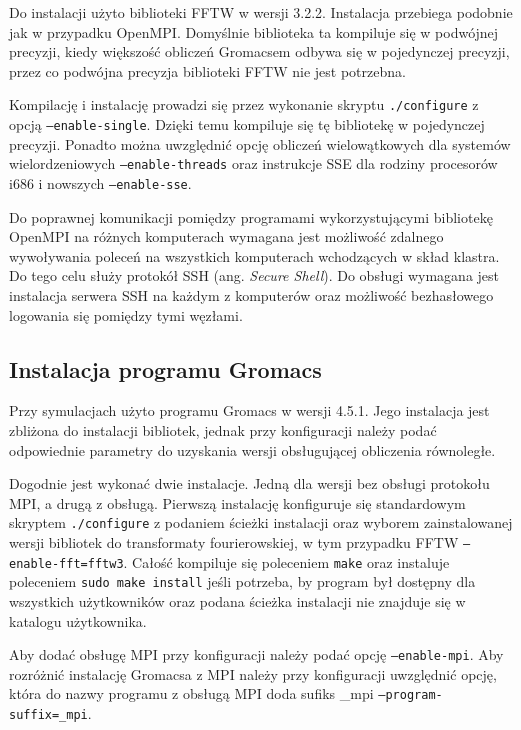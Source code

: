 Do instalacji użyto biblioteki FFTW w wersji 3.2.2. Instalacja przebiega podobnie jak w przypadku OpenMPI. Domyślnie biblioteka ta kompiluje się w podwójnej precyzji, kiedy większość obliczeń Gromacsem odbywa się w pojedynczej precyzji, przez co podwójna precyzja biblioteki FFTW nie jest potrzebna. 

Kompilację i instalację prowadzi się przez wykonanie skryptu \texttt{./configure} z opcją \texttt{--enable-single}. Dzięki temu kompiluje się tę bibliotekę w pojedynczej precyzji. Ponadto można uwzględnić opcję obliczeń wielowątkowych dla systemów wielordzeniowych \texttt{--enable-threads} oraz instrukcje SSE dla rodziny procesorów i686 i nowszych \texttt{--enable-sse}.

Do poprawnej komunikacji pomiędzy programami wykorzystującymi bibliotekę OpenMPI na różnych komputerach wymagana jest możliwość zdalnego wywoływania poleceń na wszystkich komputerach wchodzących w skład klastra. Do tego celu służy protokół SSH (ang. \textit{Secure Shell}). Do obsługi wymagana jest instalacja serwera SSH na każdym z komputerów oraz możliwość bezhasłowego logowania się pomiędzy tymi węzłami. 

\subsection{Instalacja programu Gromacs}

Przy symulacjach użyto programu Gromacs w wersji 4.5.1. Jego instalacja jest zbliżona do instalacji bibliotek, jednak przy konfiguracji należy podać odpowiednie parametry do uzyskania wersji obsługującej obliczenia równoległe.

Dogodnie jest wykonać dwie instalacje. Jedną dla wersji bez obsługi protokołu MPI, a drugą z obsługą. Pierwszą instalację konfiguruje się standardowym skryptem \texttt{./configure} z podaniem ścieżki instalacji oraz wyborem zainstalowanej wersji bibliotek do transformaty fourierowskiej, w tym przypadku FFTW \texttt{--enable-fft=fftw3}. Całość kompiluje się poleceniem \texttt{make} oraz instaluje poleceniem \texttt{sudo make install} jeśli potrzeba, by program był dostępny dla wszystkich użytkowników oraz podana ścieżka instalacji nie znajduje się w katalogu użytkownika.

Aby dodać obsługę MPI przy konfiguracji należy podać opcję \texttt{--enable-mpi}. Aby rozróżnić instalację Gromacsa z MPI należy przy konfiguracji uwzględnić opcję, która do nazwy programu z obsługą MPI doda sufiks \_mpi \texttt{--program-suffix=\_mpi}. 

